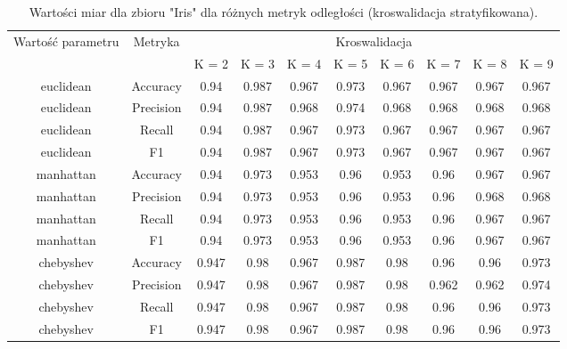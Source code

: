 
\begin{table}[H]
    \begin{tabular}{c|c|cccccccc}
       \multirow{2}{*}{Wartość parametru} & \multirow{2}{*}{Metryka} & \multicolumn{8}{|c|}{Kroswalidacja} \\
         & & K = 2 & K = 3 & K = 4 & K = 5 & K = 6 & K = 7 & K = 8 & K = 9 \\ \hline
         euclidean&Accuracy&0.94& 0.987& 0.967& 0.973& 0.967& 0.967& 0.967& 0.967\\ \hline
euclidean&Precision&0.94& 0.987& 0.968& 0.974& 0.968& 0.968& 0.968& 0.968\\ \hline
euclidean&Recall&0.94& 0.987& 0.967& 0.973& 0.967& 0.967& 0.967& 0.967\\ \hline
euclidean&F1&0.94& 0.987& 0.967& 0.973& 0.967& 0.967& 0.967& 0.967\\ \hline
manhattan&Accuracy&0.94& 0.973& 0.953& 0.96& 0.953& 0.96& 0.967& 0.967\\ \hline
manhattan&Precision&0.94& 0.973& 0.953& 0.96& 0.953& 0.96& 0.968& 0.968\\ \hline
manhattan&Recall&0.94& 0.973& 0.953& 0.96& 0.953& 0.96& 0.967& 0.967\\ \hline
manhattan&F1&0.94& 0.973& 0.953& 0.96& 0.953& 0.96& 0.967& 0.967\\ \hline
chebyshev&Accuracy&0.947& 0.98& 0.967& 0.987& 0.98& 0.96& 0.96& 0.973\\ \hline
chebyshev&Precision&0.947& 0.98& 0.967& 0.987& 0.98& 0.962& 0.962& 0.974\\ \hline
chebyshev&Recall&0.947& 0.98& 0.967& 0.987& 0.98& 0.96& 0.96& 0.973\\ \hline
chebyshev&F1&0.947& 0.98& 0.967& 0.987& 0.98& 0.96& 0.96& 0.973 \\ \hline
    \end{tabular}
    \caption{Wartości miar dla zbioru "Iris" dla różnych metryk odległości (kroswalidacja stratyfikowana).}
\end{table}
    